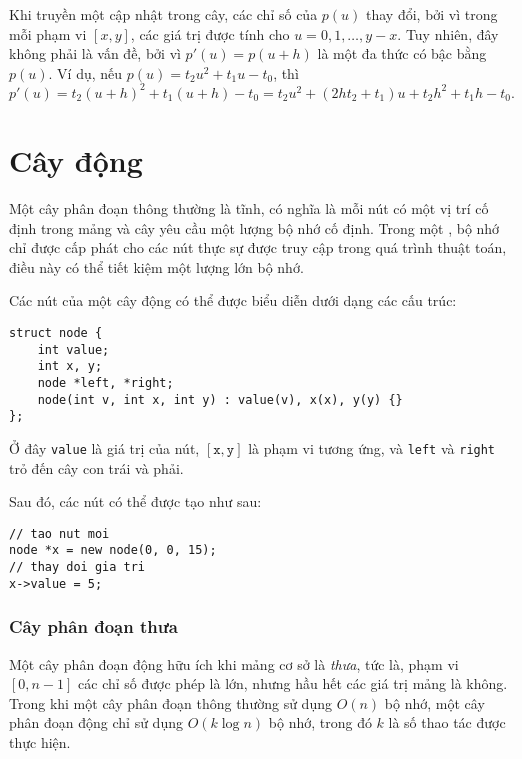 Khi truyền một cập nhật trong cây,
các chỉ số của $p(u)$ thay đổi,
bởi vì trong mỗi phạm vi $[x,y]$,
các giá trị được
tính cho $u=0,1,\ldots,y-x$.
Tuy nhiên, đây không phải là vấn đề, bởi vì
$p'(u)=p(u+h)$ là một đa thức
có bậc bằng $p(u)$.
Ví dụ, nếu $p(u)=t_2 u^2+t_1 u-t_0$, thì
\[p'(u)=t_2(u+h)^2+t_1(u+h)-t_0=t_2 u^2 + (2ht_2+t_1)u+t_2h^2+t_1h-t_0.\]

\section{Cây động}


Một cây phân đoạn thông thường là tĩnh,
có nghĩa là mỗi nút có một vị trí cố định
trong mảng và cây yêu cầu
một lượng bộ nhớ cố định.
Trong một ,
bộ nhớ chỉ được cấp phát cho các nút
thực sự được truy cập trong quá trình thuật toán,
điều này có thể tiết kiệm một lượng lớn bộ nhớ.

Các nút của một cây động có thể được biểu diễn dưới dạng các cấu trúc:
\begin{lstlisting}
struct node {
    int value;
    int x, y;
    node *left, *right;
    node(int v, int x, int y) : value(v), x(x), y(y) {}
};
\end{lstlisting}
Ở đây \texttt{value} là giá trị của nút,
$[\texttt{x},\texttt{y}]$ là phạm vi tương ứng,
và \texttt{left} và \texttt{right} trỏ đến
cây con trái và phải.

Sau đó, các nút có thể được tạo như sau:
\begin{lstlisting}
// tao nut moi
node *x = new node(0, 0, 15);
// thay doi gia tri
x->value = 5;
\end{lstlisting}

\subsubsection{Cây phân đoạn thưa}


Một cây phân đoạn động hữu ích khi
mảng cơ sở là \emph{thưa},
tức là, phạm vi $[0,n-1]$
các chỉ số được phép là lớn,
nhưng hầu hết các giá trị mảng là không.
Trong khi một cây phân đoạn thông thường sử dụng $O(n)$ bộ nhớ,
một cây phân đoạn động chỉ sử dụng $O(k \log n)$ bộ nhớ,
trong đó $k$ là số thao tác được thực hiện.

